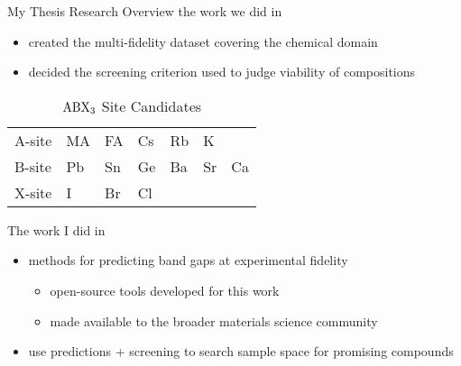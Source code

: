\documentclass[10pt, aspectratio=169, presentation]{beamer}
\begin{document}
\begin{frame}[label={sec:orga3ff486}]{My Thesis Research Overview}
the work we did in 
\begin{itemize}
\item created the multi-fidelity dataset covering the chemical domain
\item decided the screening criterion used to judge viability of compositions
\end{itemize}

\begin{table}[htbp]
\caption{\(\ce{ABX3}\) Site Candidates}
\centering
\begin{tabular}{l|llllll}
A-site & MA & FA & Cs & Rb & K & \\[0pt]
B-site & Pb & Sn & Ge & Ba & Sr & Ca\\[0pt]
X-site & I & Br & Cl &  &  & \\[0pt]
\end{tabular}
\end{table}

The work I did in 
\begin{itemize}
\item methods for predicting band gaps at experimental fidelity
\begin{itemize}
\item open-source tools developed for this work
\item made available to the broader materials science community
\end{itemize}
\item use predictions + screening to search sample space for promising compounds
\end{itemize}
\end{frame}
\end{document}
